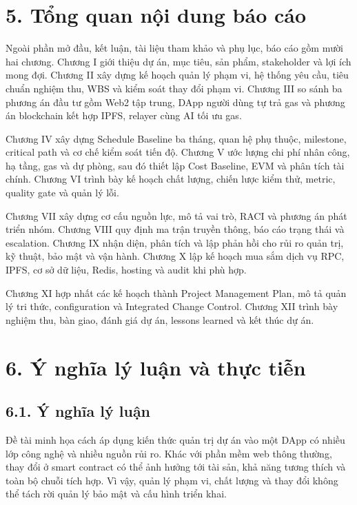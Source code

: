 \section*{5. Tổng quan nội dung báo cáo}
\iffalse
{}

Ngoài phần mở đầu, kết luận, tài liệu tham khảo và phụ lục, báo cáo gồm mười hai chương. Chương I giới thiệu dự án, mục tiêu, sản phẩm, stakeholder và lợi ích mong đợi. Chương II xây dựng kế hoạch quản lý phạm vi, hệ thống yêu cầu, tiêu chuẩn nghiệm thu, WBS và kiểm soát thay đổi phạm vi. Chương III so sánh ba phương án đầu tư gồm Web2 tập trung, DApp người dùng tự trả gas và phương án blockchain kết hợp IPFS, relayer cùng AI tối ưu gas.

Chương IV xây dựng Schedule Baseline ba tháng, quan hệ phụ thuộc, milestone, critical path và cơ chế kiểm soát tiến độ. Chương V ước lượng chi phí nhân công, hạ tầng, gas và dự phòng, sau đó thiết lập Cost Baseline, EVM và phân tích tài chính. Chương VI trình bày kế hoạch chất lượng, chiến lược kiểm thử, metric, quality gate và quản lý lỗi.

Chương VII xây dựng cơ cấu nguồn lực, mô tả vai trò, RACI và phương án phát triển nhóm. Chương VIII quy định ma trận truyền thông, báo cáo trạng thái và escalation. Chương IX nhận diện, phân tích và lập phản hồi cho rủi ro quản trị, kỹ thuật, bảo mật và vận hành. Chương X lập kế hoạch mua sắm dịch vụ RPC, IPFS, cơ sở dữ liệu, Redis, hosting và audit khi phù hợp.

Chương XI hợp nhất các kế hoạch thành Project Management Plan, mô tả quản lý tri thức, configuration và Integrated Change Control. Chương XII trình bày nghiệm thu, bàn giao, đánh giá dự án, lessons learned và kết thúc dự án.

\section*{6. Ý nghĩa lý luận và thực tiễn}

\subsection*{6.1. Ý nghĩa lý luận}

Đề tài minh họa cách áp dụng kiến thức quản trị dự án vào một DApp có nhiều lớp công nghệ và nhiều nguồn rủi ro. Khác với phần mềm web thông thường, thay đổi ở smart contract có thể ảnh hưởng tới tài sản, khả năng tương thích và toàn bộ chuỗi tích hợp. Vì vậy, quản lý phạm vi, chất lượng và thay đổi không thể tách rời quản lý bảo mật và cấu hình triển khai.


